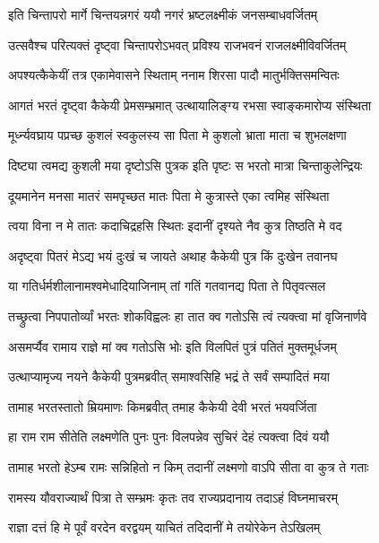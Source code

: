 \twolineshloka
{इति चिन्तापरो मार्गे चिन्तयन्नगरं ययौ}
{नगरं भ्रष्टलक्ष्मीकं जनसम्बाधवर्जितम्} %

\twolineshloka
{उत्सवैश्च परित्यक्तं दृष्ट्वा चिन्तापरोऽभवत्}
{प्रविश्य राजभवनं राजलक्ष्मीविवर्जितम्} %

\twolineshloka
{अपश्यत्कैकेयीं तत्र एकामेवासने स्थिताम्}
{ननाम शिरसा पादौ मातुर्भक्तिसमन्वितः} %

\twolineshloka
{आगतं भरतं दृष्ट्वा कैकेयी प्रेमसम्भ्रमात्}
{उत्थायालिङ्ग्य रभसा स्वाङ्कमारोप्य संस्थिता} %

\twolineshloka
{मूर्ध्न्यवघ्राय पप्रच्छ कुशलं स्वकुलस्य सा}
{पिता मे कुशलो भ्राता माता च शुभलक्षणा} %

\twolineshloka
{दिष्ट्या त्वमद्य कुशली मया दृष्टोऽसि पुत्रक}
{इति पृष्टः स भरतो मात्रा चिन्ताकुलेन्द्रियः} %

\twolineshloka
{दूयमानेन मनसा मातरं समपृच्छत}
{मातः पिता मे कुत्रास्ते एका त्वमिह संस्थिता} %

\twolineshloka
{त्वया विना न मे तातः कदाचिद्रहसि स्थितः}
{इदानीं दृश्यते नैव कुत्र तिष्ठति मे वद} %

\twolineshloka
{अदृष्ट्वा पितरं मेऽद्य भयं दुःखं च जायते}
{अथाह कैकेयी पुत्र किं दुःखेन तवानघ} %

\twolineshloka
{या गतिर्धर्मशीलानामश्वमेधादियाजिनाम्}
{तां गतिं गतवानद्य पिता ते पितृवत्सल} %

\twolineshloka
{तच्छ्रुत्वा निपपातोर्व्यां भरतः शोकविह्वलः}
{हा तात क्व गतोऽसि त्वं त्यक्त्वा मां वृजिनार्णवे} %

\twolineshloka
{असमर्प्यैव रामाय राज्ञे मां क्व गतोऽसि भोः}
{इति विलपितं पुत्रं पतितं मुक्तमूर्धजम्} %

\twolineshloka
{उत्थाप्यामृज्य नयने कैकेयी पुत्रमब्रवीत्}
{समाश्वसिहि भद्रं ते सर्वं सम्पादितं मया} %

\twolineshloka
{तामाह भरतस्तातो म्रियमाणः किमब्रवीत्}
{तमाह कैकेयी देवी भरतं भयवर्जिता} %

\twolineshloka
{हा राम राम सीतेति लक्ष्मणेति पुनः पुनः}
{विलपन्नेव सुचिरं देहं त्यक्त्वा दिवं ययौ} %

\twolineshloka
{तामाह भरतो हेऽम्ब रामः सन्निहितो न किम्}
{तदानीं लक्ष्मणो वाऽपि सीता वा कुत्र ते गताः} %

\twolineshloka
{रामस्य यौवराज्यार्थं पित्रा ते सम्भ्रमः कृतः}
{तव राज्यप्रदानाय तदाऽहं विघ्नमाचरम्} %

\twolineshloka
{राज्ञा दत्तं हि मे पूर्वं वरदेन वरद्वयम्}
{याचितं तदिदानीं मे तयोरेकेन तेऽखिलम्} %

